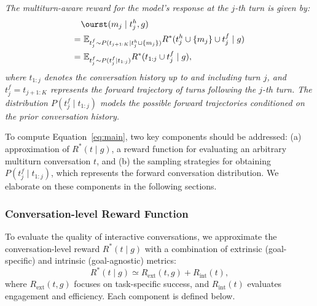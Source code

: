 \textit{The multiturn-aware reward for the model’s response at the $j$-th turn is given by:}
\begin{equation}
\begin{aligned}
    &\text{\ourst}(m_j \mid t_j^h, g) \\=& 
    ~\mathbb{E}_{t_j^f \sim P(t_{j+1:K} \mid t_j^h \cup \{m_j\})} R^*(t_j^h \cup \{m_j\} \cup t_j^f \mid g) \\
    = &~\mathbb{E}_{t_j^f \sim P(t_j^f \mid t_{1:j})} R^*(t_{1:j} \cup t_j^f \mid g),
    \label{eq:main}
\end{aligned}
\end{equation}
\textit{where $t_{1:j}$ denotes the conversation history up to and including turn $j$, and {\small $t_j^f = t_{j+1:K}$} represents the forward trajectory of turns following the $j$-th turn. The distribution {\small $P(t_j^f \mid t_{1:j})$} models the possible forward trajectories conditioned on the prior conversation history.} 

To compute Equation~\ref{eq:main}, two key components should be addressed:  
(a) approximation of $R^*(t \mid g)$, a reward function for evaluating an arbitrary multiturn conversation $t$, and  
(b) the sampling strategies for obtaining $P(t_j^f \mid t_{1:j})$, which represents the forward conversation distribution.  We elaborate on these components in the following sections.

\subsubsection{Conversation-level Reward Function}

To evaluate the quality of interactive conversations, we approximate the conversation-level reward $R^*(t \mid g)$ with a combination of extrinsic (goal-specific) and intrinsic (goal-agnostic) metrics:
\begin{equation}
R^*(t \mid g) \simeq R_{\text{ext}}(t, g) + R_{\text{int}}(t),
\end{equation}
where $R_{\text{ext}}(t, g)$ focuses on task-specific success, and $R_{\text{int}}(t)$ evaluates engagement and efficiency. Each component is defined below.


